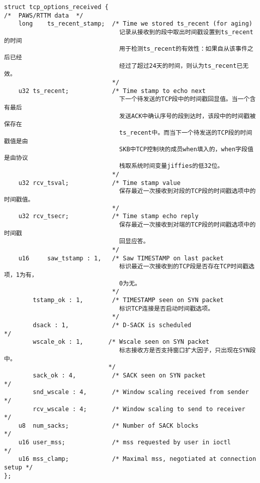 \begin{verbatim}
struct tcp_options_received {
/*  PAWS/RTTM data  */
    long    ts_recent_stamp;  /* Time we stored ts_recent (for aging)        
                                记录从接收到的段中取出时间戳设置到ts_recent的时间
                                用于检测ts_recent的有效性：如果自从该事件之后已经
                                经过了超过24天的时间，则认为ts_recent已无效。
                              */
    u32 ts_recent;            /* Time stamp to echo next                     
                                下一个待发送的TCP段中的时间戳回显值。当一个含有最后
                                发送ACK中确认序号的段到达时，该段中的时间戳被保存在
                                ts_recent中。而当下一个待发送的TCP段的时间戳值是由
                                SKB中TCP控制块的成员when填入的，when字段值是由协议
                                栈取系统时间变量jiffies的低32位。
                              */
    u32 rcv_tsval;            /* Time stamp value                            
                                保存最近一次接收到对段的TCP段的时间戳选项中的时间戳值。
                              */
    u32 rcv_tsecr;            /* Time stamp echo reply                       
                                保存最近一次接收到对端的TCP段的时间戳选项中的时间戳
                                回显应答。
                              */
    u16     saw_tstamp : 1,   /* Saw TIMESTAMP on last packet                
                                标识最近一次接收到的TCP段是否存在TCP时间戳选项，1为有，
                                0为无。
                              */
        tstamp_ok : 1,        /* TIMESTAMP seen on SYN packet                
                                标识TCP连接是否启动时间戳选项。
                              */
        dsack : 1,            /* D-SACK is scheduled                         */
        wscale_ok : 1,       /* Wscale seen on SYN packet                   
								标志接收方是否支持窗口扩大因子，只出现在SYN段中。	
							 */
        sack_ok : 4,          /* SACK seen on SYN packet                     */
        snd_wscale : 4,       /* Window scaling received from sender         */
        rcv_wscale : 4;       /* Window scaling to send to receiver          */
    u8  num_sacks;            /* Number of SACK blocks                       */
    u16 user_mss;             /* mss requested by user in ioctl              */
    u16 mss_clamp;            /* Maximal mss, negotiated at connection setup */
};
\end{verbatim}            

